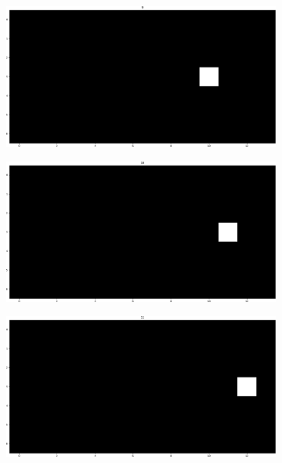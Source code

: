 \documentclass[runningheads]{llncs}
\begin{document}
\begin{figure}
	\begin{subfigure}[b]{0.32\textwidth}
		\centering
		\includegraphics[width=\textwidth]{imgs/prediction_default_lab/it_09.png}
		\caption{}
		\label{fig:localization_step9}
	\end{subfigure}
	\begin{subfigure}[b]{0.32\textwidth}
		\centering
		\includegraphics[width=\textwidth]{imgs/prediction_default_lab/it_10.png}
		\caption{}
		\label{fig:localization_step10}
	\end{subfigure}
	\begin{subfigure}[b]{0.32\textwidth}
		\centering
		\includegraphics[width=\textwidth]{imgs/prediction_default_lab/it_11.png}
		\caption{}
		\label{fig:localization_step11}
	\end{subfigure}
	

\end{figure}
\end{document}
